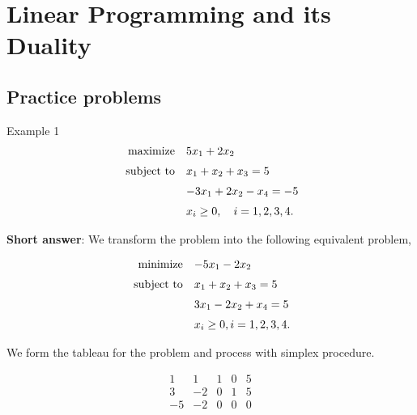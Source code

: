 \section{Linear Programming and its Duality}

\subsection{Practice problems}

Example 1
\[
	\begin{array}{rl}
		\operatorname{maximize} & 5 x_{1}+2 x_{2} \vspace{2mm}\\
		\text { subject to} & x_{1}+x_{2}+x_{3}=5 \vspace{2mm}\\
		& -3 x_{1}+2 x_{2}-x_{4}=-5 \vspace{2mm}\\
		& x_{i} \geq 0, \quad i=1,2,3,4 .
	\end{array}
\]

\textbf{Short answer}:
We transform the problem into the following equivalent problem,

\[
	\begin{array}{rl}
		\operatorname{minimize} & -5 x_{1}-2 x_{2} \vspace{2mm}\\
		\text { subject to} & x_{1}+x_{2}+x_{3}=5 \vspace{2mm}\\
		& 3 x_{1}-2 x_{2}+x_{4}=5 \vspace{2mm}\\
		& x_{i} \geq 0, i=1,2,3,4 .
	\end{array}
\]

We form the tableau for the problem and process with simplex procedure.

\begin{equation*}
	\begin{array}{cccc|c}
		1 & 1 & 1 & 0 & 5 \\
		3 & -2 & 0 & 1 & 5 \\
		\hline-5 & -2 & 0 & 0 & 0
	\end{array}
\end{equation*}

